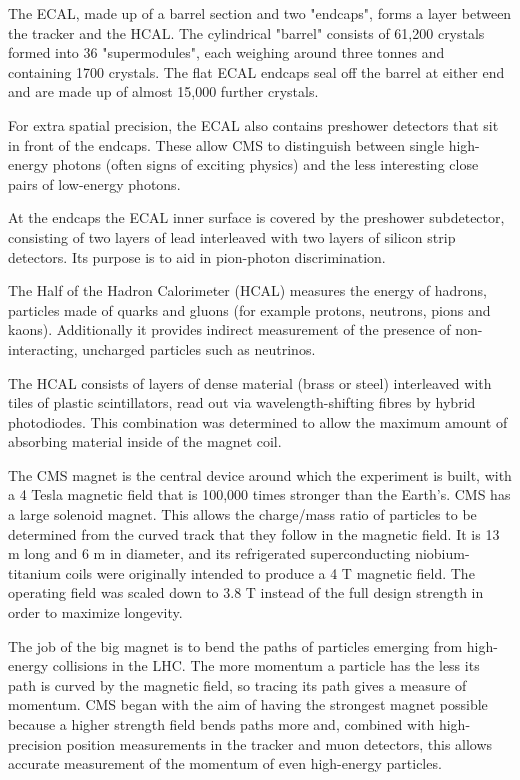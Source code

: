 The ECAL, made up of a barrel section and two "endcaps", forms a layer between the tracker and the HCAL. The cylindrical "barrel" consists of 61,200 crystals formed into 36 "supermodules", each weighing around three tonnes and containing 1700 crystals. The flat ECAL endcaps seal off the barrel at either end and are made up of almost 15,000 further crystals.

For extra spatial precision, the ECAL also contains preshower detectors that sit in front of the endcaps. These allow CMS to distinguish between single high-energy photons (often signs of exciting physics) and the less interesting close pairs of low-energy photons.

At the endcaps the ECAL inner surface is covered by the preshower subdetector, consisting of two layers of lead interleaved with two layers of silicon strip detectors. Its purpose is to aid in pion-photon discrimination.

The Half of the Hadron Calorimeter (HCAL) measures the energy of hadrons, particles made of quarks and gluons (for example protons, neutrons, pions and kaons). Additionally it provides indirect measurement of the presence of non-interacting, uncharged particles such as neutrinos.

The HCAL consists of layers of dense material (brass or steel) interleaved with tiles of plastic scintillators, read out via wavelength-shifting fibres by hybrid photodiodes. This combination was determined to allow the maximum amount of absorbing material inside of the magnet coil.

The CMS magnet is the central device around which the experiment is built, with a 4 Tesla magnetic field that is 100,000 times stronger than the Earth’s. CMS has a large solenoid magnet. This allows the charge/mass ratio of particles to be determined from the curved track that they follow in the magnetic field. It is 13 m long and 6 m in diameter, and its refrigerated superconducting niobium-titanium coils were originally intended to produce a 4 T magnetic field. The operating field was scaled down to 3.8 T instead of the full design strength in order to maximize longevity.

The job of the big magnet is to bend the paths of particles emerging from high-energy collisions in the LHC. The more momentum a particle has the less its path is curved by the magnetic field, so tracing its path gives a measure of momentum. CMS began with the aim of having the strongest magnet possible because a higher strength field bends paths more and, combined with high-precision position measurements in the tracker and muon detectors, this allows accurate measurement of the momentum of even high-energy particles.

